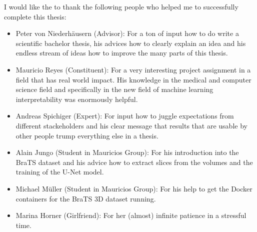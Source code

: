 I would like the to thank the following people who helped me to successfully complete this thesis:
\begin{itemize}
    \item Peter von Niederhäusern (Advisor): For a ton of input how to do write a scientific bachelor thesis, his advices how to clearly explain an idea and his endless stream of ideas how to improve the many parts of this thesis.
    \item Mauricio Reyes (Constituent): For a very interesting project assignment in a field that has real world impact. His knowledge in the medical and computer science field and specifically in the new field of machine learning interpretability was enormously helpful.
    \item Andreas Spichiger (Expert): For input how to juggle expectations from different stackeholders and his clear message that results that are usable by other people trump everything else in a thesis.
    \item Alain Jungo (Student in Mauricios Group): For his introduction into the BraTS dataset and his advice how to extract slices from the volumes and the training of the U-Net model.
    \item Michael Müller (Student in Mauricios Group): For his help to get the Docker containers for the BraTS 3D dataset running.
    \item Marina Horner (Girlfriend): For her (almost) infinite patience in a stressful time.
\end{itemize}
